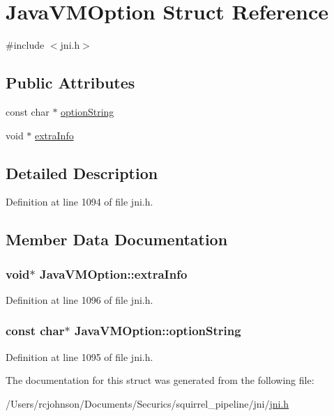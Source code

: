 \hypertarget{struct_java_v_m_option}{\section{Java\-V\-M\-Option Struct Reference}
\label{struct_java_v_m_option}
}


{\ttfamily \#include $<$jni.\-h$>$}

\subsection*{Public Attributes}
\begin{DoxyCompactItemize}
\item 
const char $\ast$ \hyperlink{struct_java_v_m_option_a9ad140fa6e01ec0cdb28e1bb680ab27e}{option\-String}
\item 
void $\ast$ \hyperlink{struct_java_v_m_option_a81e40a5edd74b6ce8f9404120729d1c2}{extra\-Info}
\end{DoxyCompactItemize}


\subsection{Detailed Description}


Definition at line 1094 of file jni.\-h.



\subsection{Member Data Documentation}
\hypertarget{struct_java_v_m_option_a81e40a5edd74b6ce8f9404120729d1c2}{
\subsubsection[{extra\-Info}]{\setlength{\rightskip}{0pt plus 5cm}void$\ast$ Java\-V\-M\-Option\-::extra\-Info}}\label{struct_java_v_m_option_a81e40a5edd74b6ce8f9404120729d1c2}


Definition at line 1096 of file jni.\-h.

\hypertarget{struct_java_v_m_option_a9ad140fa6e01ec0cdb28e1bb680ab27e}{
\subsubsection[{option\-String}]{\setlength{\rightskip}{0pt plus 5cm}const char$\ast$ Java\-V\-M\-Option\-::option\-String}}\label{struct_java_v_m_option_a9ad140fa6e01ec0cdb28e1bb680ab27e}


Definition at line 1095 of file jni.\-h.



The documentation for this struct was generated from the following file\-:\begin{DoxyCompactItemize}
\item 
/\-Users/rcjohnson/\-Documents/\-Securics/squirrel\-\_\-pipeline/jni/\hyperlink{jni_8h}{jni.\-h}\end{DoxyCompactItemize}
